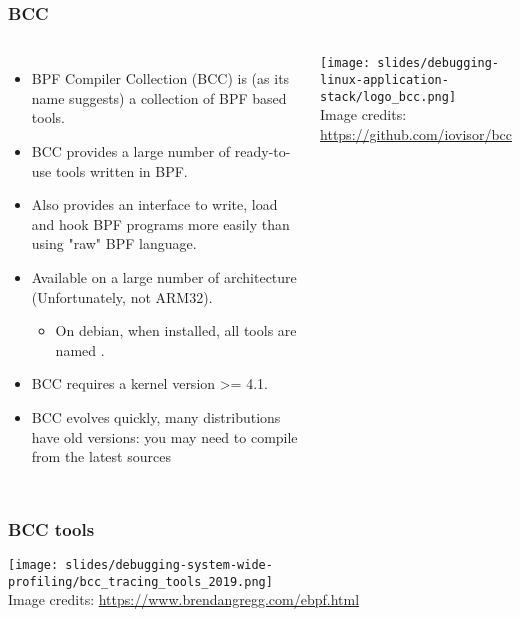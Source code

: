 \begin{frame}[fragile]
  \frametitle{BCC}
  \begin{columns}
    \begin{itemize}
      \item BPF Compiler Collection (BCC) is (as its name suggests) a collection
            of BPF based tools.
      \item BCC provides a large number of ready-to-use tools written in BPF.
      \item Also provides an interface to write, load and hook BPF programs more
            easily than using "raw" BPF language.
      \item Available on a large number of architecture (Unfortunately, not ARM32).
      \begin{itemize}
        \item On debian, when installed, all tools are named .
      \end{itemize}
      \item BCC requires a kernel version >= 4.1.
      \item BCC evolves quickly, many distributions have old versions: you
            may need to compile from the latest sources
    \end{itemize}
  \vspace{0.5cm}
  \texttt{[image: slides/debugging-linux-application-stack/logo\_bcc.png]}\\
  \tiny Image credits: \url{https://github.com/iovisor/bcc}
  \end{columns}
\end{frame}

\begin{frame}[fragile]
  \frametitle{BCC tools}
  \begin{center}
    \texttt{[image: slides/debugging-system-wide-profiling/bcc\_tracing\_tools\_2019.png]}\\
    \tiny Image credits: \url{https://www.brendangregg.com/ebpf.html}
  \end{center}
\end{frame}

